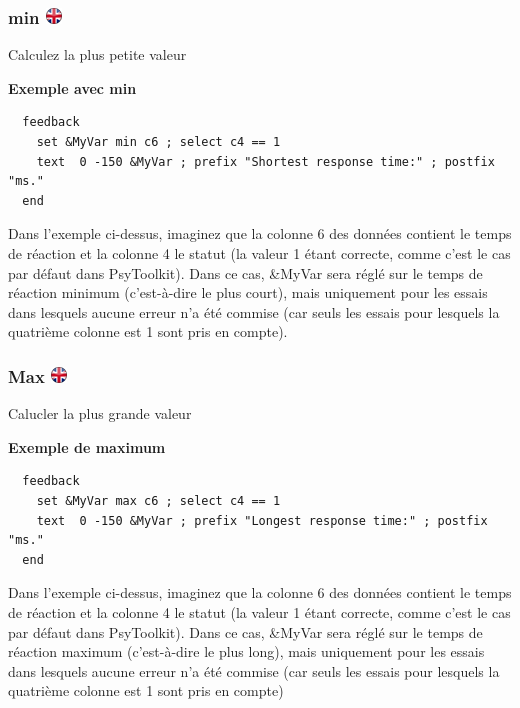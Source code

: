 \documentclass[
]{book}
\begin{document}
\hypertarget{min-ukflag}{%
\subsubsection[min ]{\texorpdfstring{min
\href{https://www.psytoolkit.org/doc3.1.0/feedback.html\#_min}{\protect\includegraphics{img/ukflag.png}}}{min ukflag}}\label{min-ukflag}}

Calculez la plus petite valeur

\textbf{Exemple avec min }

\begin{verbatim}
  feedback
    set &MyVar min c6 ; select c4 == 1
    text  0 -150 &MyVar ; prefix "Shortest response time:" ; postfix "ms."
  end
\end{verbatim}

Dans l'exemple ci-dessus, imaginez que la colonne 6 des données contient
le temps de réaction et la colonne 4 le statut (la valeur 1 étant
correcte, comme c'est le cas par défaut dans PsyToolkit). Dans ce cas,
\&MyVar sera réglé sur le temps de réaction minimum (c'est-à-dire le
plus court), mais uniquement pour les essais dans lesquels aucune erreur
n'a été commise (car seuls les essais pour lesquels la quatrième colonne
est 1 sont pris en compte).

\hypertarget{max-ukflag}{%
\subsubsection[Max ]{\texorpdfstring{Max
\href{https://www.psytoolkit.org/doc3.1.0/feedback.html\#_max}{\protect\includegraphics{img/ukflag.png}}}{Max ukflag}}\label{max-ukflag}}

Calucler la plus grande valeur

\textbf{Exemple de maximum}

\begin{verbatim}
  feedback
    set &MyVar max c6 ; select c4 == 1
    text  0 -150 &MyVar ; prefix "Longest response time:" ; postfix "ms."
  end
\end{verbatim}

Dans l'exemple ci-dessus, imaginez que la colonne 6 des données contient
le temps de réaction et la colonne 4 le statut (la valeur 1 étant
correcte, comme c'est le cas par défaut dans PsyToolkit). Dans ce cas,
\&MyVar sera réglé sur le temps de réaction maximum (c'est-à-dire le
plus long), mais uniquement pour les essais dans lesquels aucune erreur
n'a été commise (car seuls les essais pour lesquels la quatrième colonne
est 1 sont pris en compte)
\end{document}
